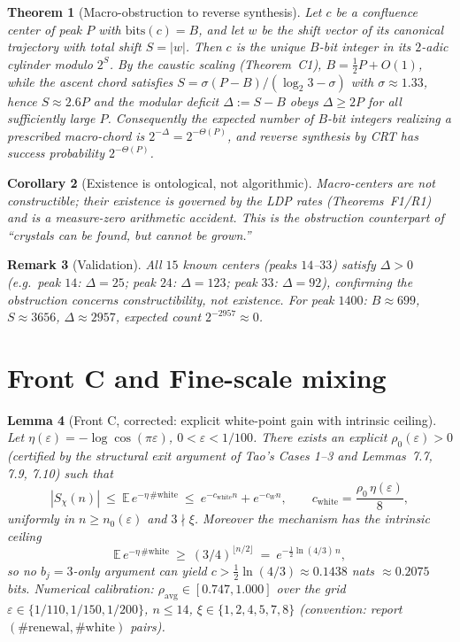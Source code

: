 \documentclass[12pt,a4paper]{article}
\newtheorem{theorem}{Theorem}[section]
\newtheorem{lemma}[theorem]{Lemma}
\newtheorem{corollary}[theorem]{Corollary}
\newtheorem{remark}[theorem]{Remark}
\begin{document}
\begin{theorem}[Macro-obstruction to reverse synthesis]
\label{thm:macro_obstruction}
Let $c$ be a confluence center of peak $P$ with $\mathrm{bits}(c)=B$, and let $w$
be the shift vector of its canonical trajectory with total shift $S=|w|$.
Then $c$ is the unique $B$-bit integer in its $2$-adic cylinder modulo $2^{S}$.
By the caustic scaling (Theorem~C1), $B=\tfrac12 P+O(1)$, while the ascent chord
satisfies $S=\sigma(P-B)/(\log_2 3-\sigma)$ with $\sigma\approx1.33$, hence
$S\approx2.6P$ and the modular deficit $\Delta:=S-B$ obeys $\Delta\ge2P$ for all
sufficiently large $P$. Consequently the expected number of $B$-bit integers
realizing a prescribed macro-chord is $2^{-\Delta}=2^{-\Theta(P)}$, and reverse
synthesis by CRT has success probability $2^{-\Theta(P)}$.
\end{theorem}

\begin{corollary}[Existence is ontological, not algorithmic]
Macro-centers are not constructible; their existence is governed by the LDP
rates (Theorems~F1/R1) and is a measure-zero arithmetic accident. This is the
obstruction counterpart of ``crystals can be found, but cannot be grown.''
\end{corollary}

\begin{remark}[Validation]
All $15$ known centers (peaks $14$--$33$) satisfy $\Delta>0$
(e.g.\ peak $14$: $\Delta=25$; peak $24$: $\Delta=123$; peak $33$: $\Delta=92$),
confirming the obstruction concerns constructibility, not existence.
For peak $1400$: $B\approx699$, $S\approx3656$, $\Delta\approx2957$, expected count
$2^{-2957}\approx0$.
\end{remark}

\section{Front C and Fine-scale mixing}
\label{sec:front_c}

\begin{lemma}[Front C, corrected: explicit white-point gain with intrinsic ceiling]
\label{lem:front_c2}
Let $\eta(\varepsilon)=-\log\cos(\pi\varepsilon)$, $0<\varepsilon<1/100$. There exists an
explicit $\rho_0(\varepsilon)>0$ (certified by the structural exit argument of
Tao's Cases 1--3 and Lemmas~7.7, 7.9, 7.10) such that
\[
|S_\chi(n)|\ \le\ \mathbb E\,e^{-\eta\,\#\mathrm{white}}
\ \le\ e^{-c_{\mathrm{white}} n}+e^{-c_W n},\qquad
c_{\mathrm{white}}=\frac{\rho_0\,\eta(\varepsilon)}{8},
\]
uniformly in $n\ge n_0(\varepsilon)$ and $3\nmid\xi$. Moreover the mechanism has
the intrinsic ceiling
\[
\mathbb E\,e^{-\eta\,\#\mathrm{white}}\ \ge\ (3/4)^{\lfloor n/2\rfloor}
\ =\ e^{-\frac12\ln(4/3)\,n},
\]
so no $b_j{=}3$-only argument can yield $c>\tfrac12\ln(4/3)\approx0.1438$ nats
$\approx0.2075$ bits. Numerical calibration: $\rho_{\mathrm{avg}}\in[0.747,1.000]$
over the grid $\varepsilon\in\{1/110,1/150,1/200\}$, $n\le14$, $\xi\in\{1,2,4,5,7,8\}$
(convention: report $(\#\mathrm{renewal},\#\mathrm{white})$ pairs).
\end{lemma}
\end{document}
